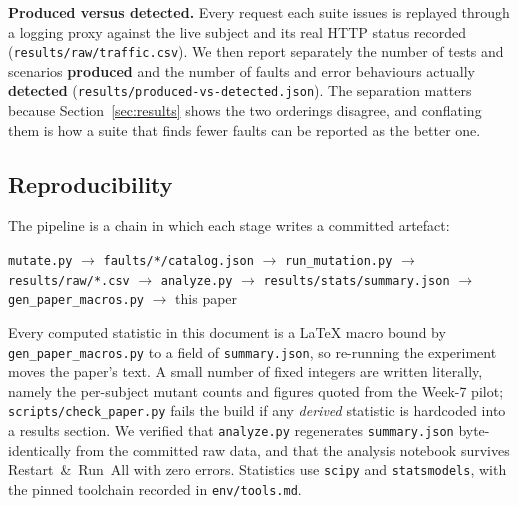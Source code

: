 \textbf{Produced versus detected.} Every request each suite issues is replayed through a
logging proxy against the live subject and its real HTTP status recorded
(\texttt{results/raw/traffic.csv}). We then report separately the number of tests and
scenarios \textbf{produced} and the number of faults and error behaviours actually
\textbf{detected} (\texttt{results/produced-vs-detected.json}). The separation matters because
Section~\ref{sec:results} shows the two orderings disagree, and conflating them is how a suite
that finds fewer faults can be reported as the better one.

\subsection{Reproducibility}
\label{sec:method-repro}

The pipeline is a chain in which each stage writes a committed artefact:

\begin{center}
\texttt{mutate.py} $\rightarrow$ \texttt{faults/*/catalog.json} $\rightarrow$
\texttt{run\_mutation.py} $\rightarrow$ \texttt{results/raw/*.csv} $\rightarrow$
\texttt{analyze.py} $\rightarrow$ \texttt{results/stats/summary.json} $\rightarrow$
\texttt{gen\_paper\_macros.py} $\rightarrow$ this paper
\end{center}

Every computed statistic in this document is a LaTeX macro bound by
\texttt{gen\_paper\_macros.py} to a field of \texttt{summary.json}, so re-running the
experiment moves the paper's text. A small number of fixed integers are written literally,
namely the per-subject mutant counts and figures quoted from the Week-7 pilot;
\texttt{scripts/check\_paper.py} fails the build if any \emph{derived} statistic is
hardcoded into a results section. We verified that \texttt{analyze.py} regenerates
\texttt{summary.json} byte-identically from the committed raw data, and that the analysis
notebook survives Restart~\&~Run~All with zero errors. Statistics use \texttt{scipy} and
\texttt{statsmodels}, with the pinned toolchain recorded in \texttt{env/tools.md}.
